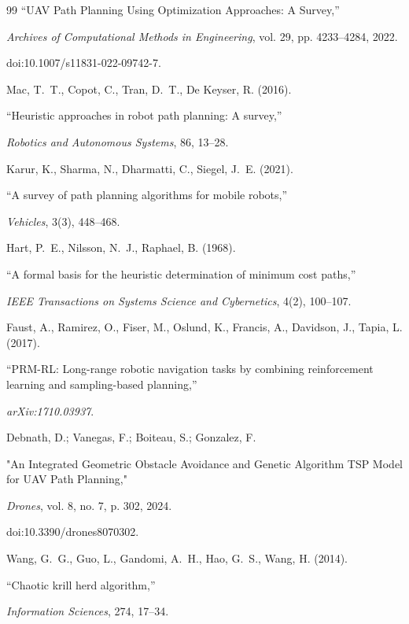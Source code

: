 \documentclass[fleqn,10pt]{wlscirep}
\begin{document}
\begin{thebibliography}{99}
``UAV Path Planning Using Optimization Approaches: A Survey,''  

\textit{Archives of Computational Methods in Engineering}, vol. 29, pp. 4233--4284, 2022.  

doi:10.1007/s11831-022-09742-7.


Mac, T.~T., Copot, C., Tran, D.~T., De Keyser, R. (2016).

``Heuristic approaches in robot path planning: A survey,''

\textit{Robotics and Autonomous Systems}, 86, 13--28.


Karur, K., Sharma, N., Dharmatti, C., Siegel, J.~E. (2021).

``A survey of path planning algorithms for mobile robots,''

\textit{Vehicles}, 3(3), 448--468.


Hart, P.~E., Nilsson, N.~J., Raphael, B. (1968).

``A formal basis for the heuristic determination of minimum cost paths,''

\textit{IEEE Transactions on Systems Science and Cybernetics}, 4(2), 100--107.


Faust, A., Ramirez, O., Fiser, M., Oslund, K., Francis, A., Davidson, J., Tapia, L. (2017).

``PRM-RL: Long-range robotic navigation tasks by combining reinforcement learning and sampling-based planning,''

\textit{arXiv:1710.03937}.


Debnath, D.; Vanegas, F.; Boiteau, S.; Gonzalez, F.  

"An Integrated Geometric Obstacle Avoidance and Genetic Algorithm TSP Model for UAV Path Planning,"  

\textit{Drones}, vol. 8, no. 7, p. 302, 2024.  

doi:10.3390/drones8070302.  


Wang, G.~G., Guo, L., Gandomi, A.~H., Hao, G.~S., Wang, H. (2014).

``Chaotic krill herd algorithm,''

\textit{Information Sciences}, 274, 17--34.


\end{thebibliography}
\end{document}
